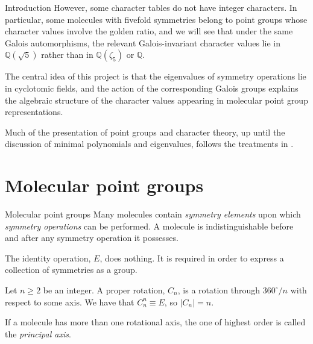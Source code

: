 \documentclass{beamer}
\newcommand{\vs}{\vspace{5mm}}
\begin{document}
    \begin{frame}{Introduction}
        However, some character tables do not have integer characters. In particular, some molecules with fivefold symmetries belong to point groups whose character values involve the golden ratio, and we will see that under the same Galois automorphisms, the relevant Galois-invariant character values lie in $\mathbb{Q}(\sqrt{5})$ rather than in $\mathbb{Q}(\zeta_5)$ or $\mathbb{Q}$.
        \vs

        {
            The central idea of this project is that the eigenvalues of symmetry operations lie in cyclotomic fields, and the action of the corresponding Galois groups explains the algebraic structure of the character values appearing in molecular point group representations.
        }
        \vs

        {
            Much of the presentation of point groups and character theory, up until the discussion of minimal polynomials and eigenvalues, follows the treatments in \cite{miessler2014,mcgrady2024,vallance,young}.
        }
    \end{frame}

    \section{Molecular point groups}

    \begin{frame}{Molecular point groups}
        Many molecules contain \emph{symmetry elements} upon which \emph{symmetry operations} can be performed. A molecule is indistinguishable before and after any symmetry operation it possesses.
        \vs
    
        {
            The identity operation, $E$, does nothing. It is required in order to express a collection of symmetries as a group.
        }
        \vs

        {
            Let $n\geq2$ be an integer. A proper rotation, $C_n$, is a rotation through $360^\circ/n$ with respect to some axis. We have that $C_n^n\equiv E$, so $|C_n|=n$.
        }
        \vs

        {
            If a molecule has more than one rotational axis, the one of highest order is called the \emph{principal axis}.
        }
    \end{frame}
\end{document}

